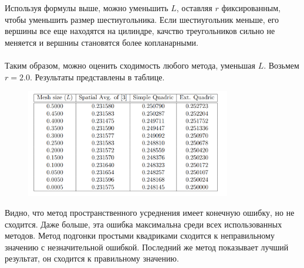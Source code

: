 \documentclass[12pt,a4paper, titlepage]{article}
\begin{document}
Используя формулы выше, можно уменьшить $L$, оставляя $r$ фиксированным, чтобы уменьшить размер шестиугольника. Если шестиугольник меньше, его вершины все еще находятся на цилиндре, качство треугольников сильно не меняется и вершниы становятся более копланарными.
\\
\\
Таким образом, можно оценить сходимость любого метода, уменьшая $L$. Возьмем $r = 2.0$. Результаты представлены в таблице. 
\begin{figure}[H]
	\centering
	\includegraphics[width = 0.8\textwidth]{3.png}
\end{figure}
Видно, что метод пространственного усреднения имеет конечную ошибку, но не сходится. Даже больше, эта ошибка максимальна среди всех использованных методов. Метод подгонки простыми квадриками сходится к неправильному значению с незначительной ошибкой. Последний же метод показывает лучший результат, он сходится к правильному значению.
\end{document}
